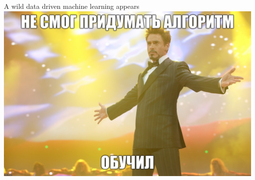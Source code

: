 \documentclass[aspectratio=169, professionalfonts]{beamer}
\begin{document}
\begin{frame}{A wild data driven machine learning appears}
    \centering
    \includegraphics[width=.73\linewidth]{graphs/fig16.jpg}
\end{frame}
\end{document}
